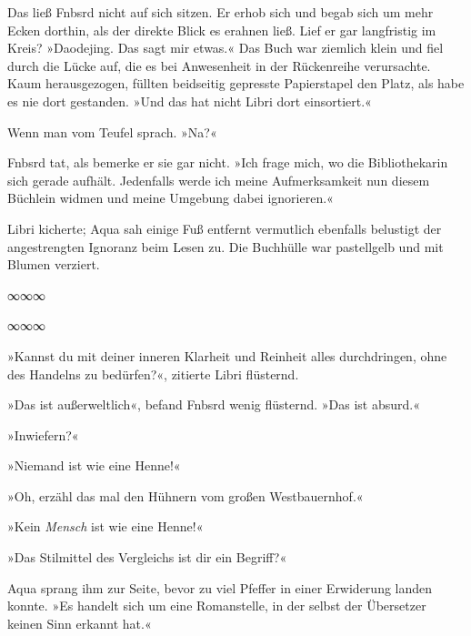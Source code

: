 Das ließ Fnbsrd nicht auf sich sitzen. Er erhob sich und begab sich um mehr Ecken dorthin, als der direkte Blick es erahnen ließ. Lief er gar langfristig im Kreis? »Daodejing. Das sagt mir etwas.« Das Buch war ziemlich klein und fiel durch die Lücke auf, die es bei Anwesenheit in der Rückenreihe verursachte. Kaum herausgezogen, füllten beidseitig gepresste Papierstapel den Platz, als habe es nie dort gestanden. »Und das hat nicht Libri dort einsortiert.«

Wenn man vom Teufel sprach. »Na?«

Fnbsrd tat, als bemerke er sie gar nicht. »Ich frage mich, wo die Bibliothekarin sich gerade aufhält. Jedenfalls werde ich meine Aufmerksamkeit nun diesem Büchlein widmen und meine Umgebung dabei ignorieren.«

Libri kicherte; Aqua sah einige Fuß entfernt vermutlich ebenfalls belustigt der angestrengten Ignoranz beim Lesen zu. Die Buchhülle war pastellgelb und mit Blumen verziert.

\begin{center}
∞∞∞
\end{center}

\noindent {}

\begin{center}
∞∞∞
\end{center}


»Kannst du mit deiner inneren Klarheit und Reinheit alles durchdringen, ohne des Handelns zu bedürfen?«, zitierte Libri flüsternd.

»Das ist außerweltlich«, befand Fnbsrd wenig flüsternd. »Das ist absurd.«

»Inwiefern?«

»Niemand ist wie eine Henne!«

»Oh, erzähl das mal den Hühnern vom großen Westbauernhof.«

»Kein \emph{Mensch} ist wie eine Henne!«

»Das Stilmittel des Vergleichs ist dir ein Begriff?«

Aqua sprang ihm zur Seite, bevor zu viel Pfeffer in einer Erwiderung landen konnte. »Es handelt sich um eine Romanstelle, in der selbst der Übersetzer keinen Sinn erkannt hat.«


